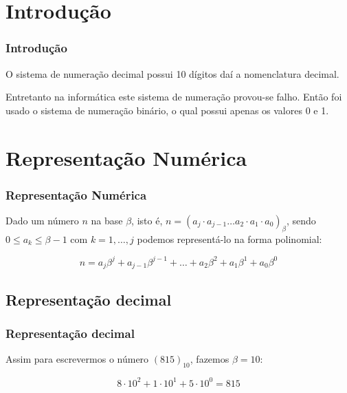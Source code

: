 \begin{frame}\frametitle{}


\end{frame}

\section{Introdução}

\begin{frame}\frametitle{Introdução}

O sistema de numeração decimal possui 10 dígitos daí a nomenclatura
decimal.

Entretanto na informática este sistema de numeração provou-se falho.
Então foi usado o sistema de numeração binário, o qual possui apenas os
valores 0 e 1.

\end{frame}

\begin{frame}\frametitle{}


\end{frame}

\section{Representação Numérica}

\begin{frame}\frametitle{Representação Numérica}

Dado um número $n$ na base $\beta$, isto é,
$n = (a_j \cdot a_{j-1} \dots a_2 \cdot a_1 \cdot a_0)_\beta$, sendo
$0 \le a_k \le \beta-1$ com $k = 1, \dots, j$ podemos representá-lo na
forma polinomial:

\begin{equation}
n = a_j \beta^j + a_{j-1} \beta^{j-1} + \dots + a_2 \beta^2 + a_1 \beta^1 + a_0 \beta^0
\end{equation}

\end{frame}

\subsection{Representação decimal}

\begin{frame}\frametitle{Representação decimal}

Assim para escrevermos o número $(815)_{10}$, fazemos $\beta = 10$:

\begin{equation}
8 \cdot 10^2 + 1 \cdot 10^1 + 5 \cdot 10^0 = 815
\end{equation}

\end{frame}

